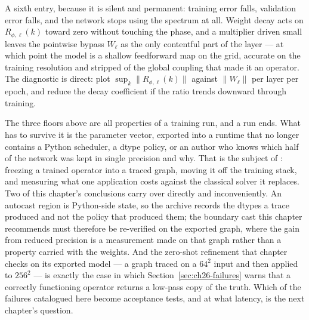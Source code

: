 A sixth entry, because it is silent and permanent: training error falls, validation error
falls, and the network stops using the spectrum at all. Weight decay acts on
$R_{\phi,\ell}(k)$ toward zero without touching the phase, and a multiplier driven small
leaves the pointwise bypass $W_\ell$ as the only contentful part of the layer --- at which
point the model is a shallow feedforward map on the grid, accurate on the training resolution
and stripped of the global coupling that made it an operator. The diagnostic is direct: plot
$\sup_k \lVert R_{\phi,\ell}(k)\rVert$ against $\lVert W_\ell\rVert$ per layer per epoch, and
reduce the decay coefficient if the ratio trends downward through training.


\medskip
The three floors above are all properties of a training run, and a run ends. What has to
survive it is the parameter vector, exported into a runtime that no longer contains a
Python scheduler, a dtype policy, or an author who knows which half of the network was kept
in single precision and why. That is the subject of
: freezing a trained operator
into a traced graph, moving it off the training stack, and measuring what one application
costs against the classical solver it replaces. Two of this chapter's conclusions carry over
directly and inconveniently. An autocast region is Python-side state, so the archive records
the dtypes a trace produced and not the policy that produced them; the boundary cast this
chapter recommends must therefore be re-verified on the exported graph, where the gain from
reduced precision is a measurement made on that graph rather than a property carried with the
weights. And the zero-shot refinement that
chapter checks on its exported model --- a graph traced on a $64^2$ input and then applied to
$256^2$ --- is exactly the case in which Section~\ref{sec:ch26-failures} warns that a
correctly functioning operator returns a low-pass copy of the truth. Which of the failures
catalogued here become acceptance tests, and at what latency, is the next chapter's question.
